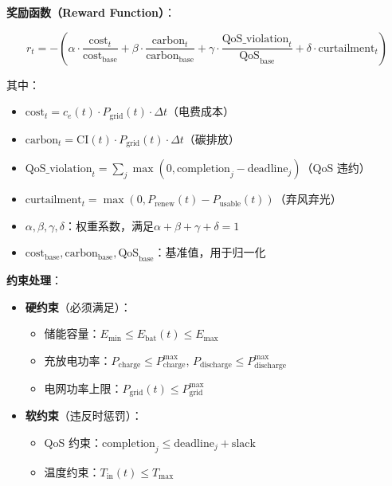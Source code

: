 \documentclass[12pt,a4paper]{article}
\begin{document}
\textbf{奖励函数（Reward Function）}：

\begin{equation}
r_t = -\left( 
\alpha \cdot \frac{\text{cost}_t}{\text{cost}_{\text{base}}} + 
\beta \cdot \frac{\text{carbon}_t}{\text{carbon}_{\text{base}}} + 
\gamma \cdot \frac{\text{QoS\_violation}_t}{\text{QoS}_{\text{base}}} +
\delta \cdot \text{curtailment}_t
\right)
\label{eq:rl-reward}
\end{equation}

其中：
\begin{itemize}
    \item $\text{cost}_t = c_e(t) \cdot P_{\text{grid}}(t) \cdot \Delta t$（电费成本）
    \item $\text{carbon}_t = \text{CI}(t) \cdot P_{\text{grid}}(t) \cdot \Delta t$（碳排放）
    \item $\text{QoS\_violation}_t = \sum_j \max(0, \text{completion}_j - \text{deadline}_j)$（QoS 违约）
    \item $\text{curtailment}_t = \max(0, P_{\text{renew}}(t) - P_{\text{usable}}(t))$（弃风弃光）
    \item $\alpha, \beta, \gamma, \delta$：权重系数，满足$\alpha+\beta+\gamma+\delta=1$
    \item $\text{cost}_{\text{base}}, \text{carbon}_{\text{base}}, \text{QoS}_{\text{base}}$：基准值，用于归一化
\end{itemize}

\textbf{约束处理}：

\begin{itemize}
    \item \textbf{硬约束}（必须满足）：
    \begin{itemize}
        \item 储能容量：$E_{\min} \leq E_{\text{bat}}(t) \leq E_{\max}$
        \item 充放电功率：$P_{\text{charge}} \leq P_{\text{charge}}^{\max}$, $P_{\text{discharge}} \leq P_{\text{discharge}}^{\max}$
        \item 电网功率上限：$P_{\text{grid}}(t) \leq P_{\text{grid}}^{\max}$
    \end{itemize}
    
    \item \textbf{软约束}（违反时惩罚）：
    \begin{itemize}
        \item QoS 约束：$\text{completion}_j \leq \text{deadline}_j + \text{slack}$
        \item 温度约束：$T_{\text{in}}(t) \leq T_{\max}$
    \end{itemize}
\end{itemize}
\end{document}
